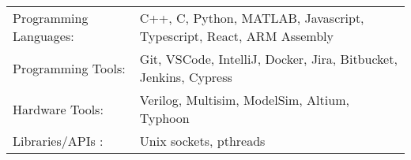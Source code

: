 \begin{tabularx}{\linewidth}{@{}l X@{}}
Programming Languages: &  \normalsize{C++, C, Python, MATLAB, Javascript, Typescript, React, ARM Assembly}\\
Programming Tools:  &  \normalsize{Git, VSCode, IntelliJ, Docker, Jira, Bitbucket, Jenkins, Cypress}\\
Hardware Tools: & \normalsize{Verilog, Multisim, ModelSim, Altium, Typhoon} \\
Libraries/APIs : & \normalsize{Unix sockets, pthreads} \\
\end{tabularx}
